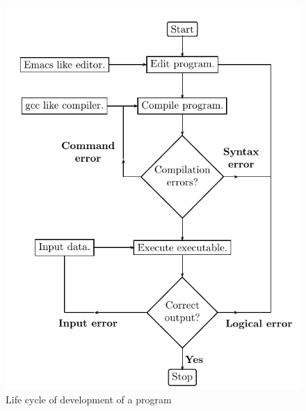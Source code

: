 \begin{figure}[t!]
\begin{center}
\includegraphics{figs/flowchart-fig1.pdf}
\end{center}
\caption{Life cycle of development of a program}
\end{figure}

